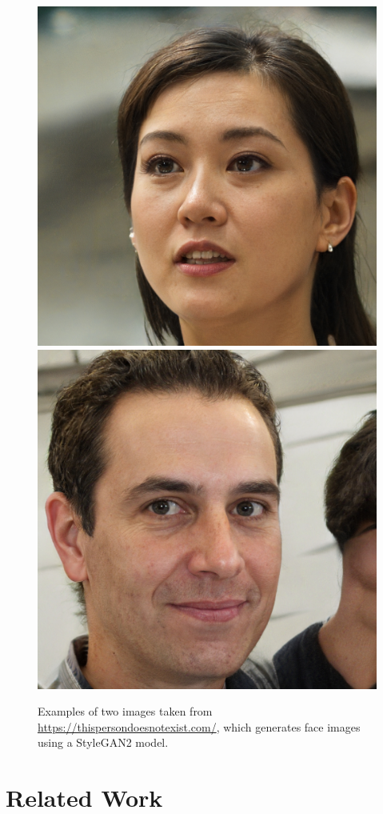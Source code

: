 \documentclass[conference]{IEEEtran}
\begin{document}
\begin{figure}
	\begin{center}
		\includegraphics[width=0.48\columnwidth]{./images/doesntexist.jpg}
		\includegraphics[width=0.48\columnwidth]{./images/doesntexist2.jpg}
		\caption{Examples of two images taken from \url{https://thispersondoesnotexist.com/}, which generates face images using a StyleGAN2 model.}
		\label{fig:figure1}
	\end{center}
\end{figure}

\section{Related Work}
\end{document}
